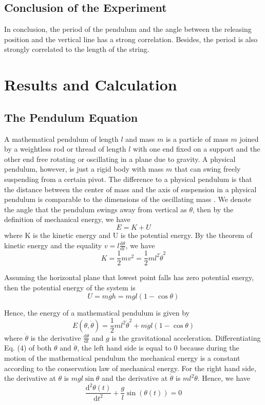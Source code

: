 \documentclass[12pt]{report}
\begin{document}
\subsection{Conclusion of the Experiment}
In conclusion, the period of the pendulum and the angle between the releasing position and the vertical line has a strong correlation. Besides, the period is also strongly correlated to the length of the string.
\section{Results and Calculation}
\subsection{The Pendulum Equation}
A mathematical pendulum of length $l$ and mass $m$ is a particle of mass $m$ joined by a weightless rod or thread of length $l$ with one end fixed on a support and the other end free rotating or oscillating in a plane due to gravity. A physical pendulum, however, is just a rigid body with mass $m$ that can swing freely suspending from a certain pivot. The difference to a physical pendulum is that the distance between the center of mass and the axis of suspension in a physical pendulum is comparable to the dimensions of the oscillating mass \cite{Awrejcewicz2012}. We denote the angle that the pendulum swings away from vertical as $\theta$, then by the definition of mechanical energy, we have
\begin{equation}
    E=K+U
\end{equation}
where K is the kinetic energy and U is the potential energy. By the theorem of kinetic energy and the equality $v=l\frac{\mathrm{d}\theta}{\mathrm{d}t}$, we have
\begin{equation}
    K=\frac{1}{2}mv^2=\frac{1}{2}ml^2{\dot{\theta}}^2
\end{equation}

Assuming the horizontal plane that lowest point falls has zero potential energy, then the potential energy of the system is
\begin{equation}
    U=mgh=mgl(1-\cos{\theta})
\end{equation}

Hence, the energy of a mathematical pendulum is given by
\begin{equation}
    E(\theta,\dot{\theta})=\frac{1}{2}ml^2{\dot{\theta}}^2+mgl(1-\cos{\theta})
\end{equation}
where $\dot{\theta}$ is the derivative $\frac{\mathrm{d}\theta}{\mathrm{d}t}$ and $g$ is the gravitational acceleration. Differentiating Eq. (4) of both $\theta$ and $\dot{\theta}$, the left hand side is equal to 0 because during the motion of the mathematical pendulum the mechanical energy is a constant according to the conservation law of mechanical energy. For the right hand side, the derivative at $\theta$ is $mgl\sin{\theta}$ and the derivative at $\dot{\theta}$ is $ml^2\ddot{\theta}$. Hence, we have
\begin{equation}
    \dfrac{\mathrm{d}^2\theta(t)}{\mathrm{d}t^2}+\dfrac{g}{l}\sin(\theta(t))=0
\end{equation}
\end{document}
